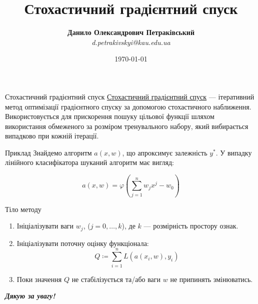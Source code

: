 \documentclass[mathserif]{beamer}
\title{Стохастичний градієнтний спуск}
\institute{Державна наукова установа \\ ``Київський академічний університет``}
\author[Д.О.~Петраківський]{\textbf{Данило Олександрович Петраківський} \\ {\textsl{d.petrakivskyi@kau.edu.ua}}}
\date{\today}
\begin{document}
    \frame{\titlepage}

    \begin{frame}{Стохастичний градієнтний спуск}
        \href{https://en.wikipedia.org/wiki/Stochastic_gradient_descent}{Стохастичний градієнтний спуск} ---
        ітеративний метод оптимізації градієнтного спуску за допомогою стохастичного наближення.
        Використовується для прискорення пошуку цільової функції шляхом використання обмеженого за розміром
        тренувального набору, який вибирається випадково при кожній ітерації.
    \end{frame}

    \begin{frame}{Приклад}
        Знайдемо алгоритм $a(x, w)$, що апроксимує залежність $y ^ *$.
        У випадку лінійного класифікатора шуканий алгоритм має вигляд:

        \[a(x, w) = \varphi \left(\sum_{j=1} ^ n w_j x ^ j - w_0 \right)\]
    \end{frame}

    \begin{frame}{Тіло методу}
        \begin{enumerate}
            \item Ініціалізувати ваги $w_j$, ($j = 0, \dots, k$), де $k$ --- розмірність простору ознак.
            \item Ініціалізувати поточну оцінку функціонала:
                \[Q \coloneqq \sum_{i=1} ^ n L(a(x_i, w), y_i)\]
            \item Поки значення $Q$ не стабілізується та/або ваги $w$ не припинять змінюватись.
        \end{enumerate}
    \end{frame}

    \begin{frame}
        \begin{center}
            \Huge \bfseries \itshape Дякую за увагу!
        \end{center}
    \end{frame}
\end{document}
